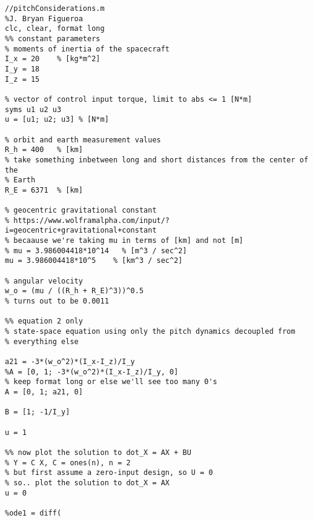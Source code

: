 \documentclass{article}
\begin{document}
\begin{lstlisting}
//pitchConsiderations.m
%J. Bryan Figueroa
clc, clear, format long
%% constant parameters
% moments of inertia of the spacecraft
I_x = 20    % [kg*m^2]
I_y = 18
I_z = 15

% vector of control input torque, limit to abs <= 1 [N*m]
syms u1 u2 u3
u = [u1; u2; u3] % [N*m]

% orbit and earth measurement values
R_h = 400   % [km]
% take something inbetween long and short distances from the center of the
% Earth
R_E = 6371  % [km]

% geocentric gravitational constant
% https://www.wolframalpha.com/input/?i=geocentric+gravitational+constant
% becaause we're taking mu in terms of [km] and not [m]
% mu = 3.986004418*10^14   % [m^3 / sec^2]
mu = 3.986004418*10^5    % [km^3 / sec^2]

% angular velocity
w_o = (mu / ((R_h + R_E)^3))^0.5
% turns out to be 0.0011

%% equation 2 only
% state-space equation using only the pitch dynamics decoupled from
% everything else

a21 = -3*(w_o^2)*(I_x-I_z)/I_y
%A = [0, 1; -3*(w_o^2)*(I_x-I_z)/I_y, 0]
% keep format long or else we'll see too many 0's
A = [0, 1; a21, 0]

B = [1; -1/I_y]

u = 1

%% now plot the solution to dot_X = AX + BU
% Y = C X, C = ones(n), n = 2
% but first assume a zero-input design, so U = 0
% so.. plot the solution to dot_X = AX
u = 0

%ode1 = diff(

\end{lstlisting}
\end{document}
